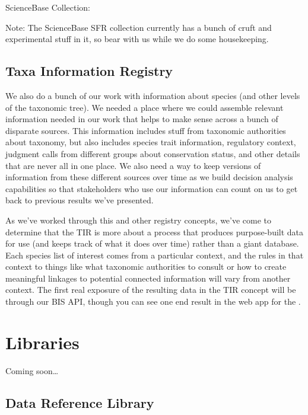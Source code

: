 \documentclass[letterpaper,10pt,english]{sphinxmanual}
\begin{document}
ScienceBase Collection: 

Note: The ScienceBase SFR collection currently has a bunch of cruft and experimental stuff in it, so bear with us while we do some housekeeping.


\subsection{Taxa Information Registry}
\label{\detokenize{bis:taxa-information-registry}}
We also do a bunch of our work with information about species (and other levels of the taxonomic tree). We needed a place where we could assemble relevant information needed in our work that helps to make sense across a bunch of disparate sources. This information includes stuff from taxonomic authorities about taxonomy, but also includes species trait information, regulatory context, judgment calls from different groups about conservation status, and other details that are never all in one place. We also need a way to keep versions of information from these different sources over time as we build decision analysis capabilities so that stakeholders who use our information can count on us to get back to previous results we’ve presented.

As we’ve worked through this and other registry concepts, we’ve come to determine that the TIR is more about a process that produces purpose-built data for use (and keeps track of what it does over time) rather than a giant database. Each species list of interest comes from a particular context, and the rules in that context to things like what taxonomic authorities to consult or how to create meaningful linkages to potential connected information will vary from another context. The first real exposure of the resulting data in the TIR concept will be through our BIS API, though you can see one end result in the web app for the .


\section{Libraries}
\label{\detokenize{bis:libraries}}
Coming soon…


\subsection{Data Reference Library}
\label{\detokenize{bis:data-reference-library}}
\end{document}
